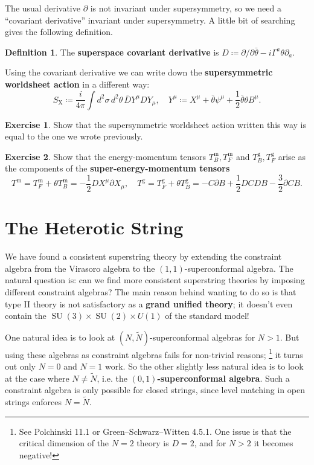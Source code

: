\documentclass{report}
\theoremstyle{plain}
\theoremstyle{definition}
\newtheorem{definition}[theorem]{Definition}
\newtheorem{exercise}{Exercise}[section]
\theoremstyle{remark}
\newcommand{\di}{\partial}
\DeclareMathOperator{\SU}{SU}
\begin{document}
The usual derivative $\di$ is not invariant under supersymmetry, so we
need a ``covariant derivative'' invariant under supersymmetry. A
little bit of searching gives the following definition.

\begin{definition}
  The {\bf superspace covariant derivative} is $D \coloneqq
  \di/\di \bar{\theta} - i \Gamma^a \theta \di_a$.
\end{definition}

Using the covariant derivative we can write down the {\bf
  supersymmetric worldsheet action} in a different way:
\[ S_{\text{X}} \coloneqq \frac{i}{4\pi} \int d^2\sigma \, d^2\theta \, \bar{D}Y^\mu DY_\mu, \quad Y^\mu \coloneqq X^\mu + \bar{\theta} \psi^\mu + \frac{1}{2} \bar{\theta} \theta B^\mu. \]

\begin{exercise}
  Show that the supersymmetric worldsheet action written this way is
  equal to the one we wrote previously.
\end{exercise}

\begin{exercise}
  Show that the energy-momentum tensors $T_B^{\text{m}},
  T_F^{\text{m}}$ and $T_B^{\text{g}}, T_F^{\text{g}}$ arise as the
  components of the {\bf super-energy-momentum tensors}
  \[ T^{\text{m}} = T_F^{\text{m}} + \theta T_B^{\text{m}} = -\frac{1}{2} DX^\mu \di X_\mu, \quad T^{\text{g}} = T_F^{\text{g}} + \theta T_B^{\text{g}} = -C \di B + \frac{1}{2} DC DB - \frac{3}{2} \di C B. \]
\end{exercise}

\section{The Heterotic String}

We have found a consistent superstring theory by extending the
constraint algebra from the Virasoro algebra to the
$(1,1)$-superconformal algebra. The natural question is: can we find
more consistent superstring theories by imposing different constraint
algebras? The main reason behind wanting to do so is that type II
theory is not satisfactory as a {\bf grand unified theory}; it doesn't
even contain the $\SU(3) \times \SU(2) \times U(1)$ of the standard
model!

One natural idea is to look at $(N, \tilde{N})$-superconformal
algebras for $N > 1$. But using these algebras as constraint algebras
fails for non-trivial reasons; \footnote{See Polchinski 11.1 or
  Green--Schwarz--Witten 4.5.1. One issue is that the critical
  dimension of the $N=2$ theory is $D=2$, and for $N > 2$ it becomes
  negative!} it turns out only $N = 0$ and $N = 1$ work. So the other
slightly less natural idea is to look at the case where $N \neq
\tilde{N}$, i.e. the {\bf $(0,1)$-superconformal algebra}. Such a
constraint algebra is only possible for closed strings, since level
matching in open strings enforces $N = \tilde{N}$.
\end{document}
